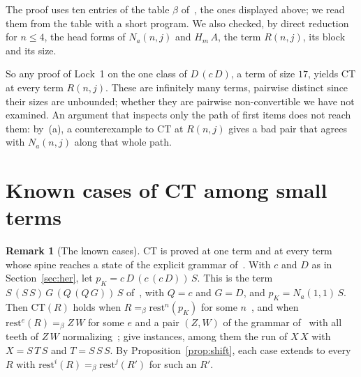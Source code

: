 \documentclass[11pt]{amsart}
\theoremstyle{definition}
\newtheorem{remark}[theorem]{Remark}
\newcommand{\conv}{=_\beta}
\newcommand{\rest}{\mathrm{rest}}
\newcommand{\CT}{\mathrm{CT}}
\begin{document}
The proof uses ten entries of the table $\beta$ of~\citep{s1}, the ones displayed above; we read
them from the table with a short program. We also checked, by direct reduction for $n\le4$, the head
forms of $N_a(n,j)$ and $H_m\,A$, the term $R(n,j)$, its block and its size.

So any proof of Lock~1 on the one class of $D\,(c\,D)$, a term of size $17$, yields CT at every
term $R(n,j)$. These are infinitely many terms, pairwise distinct since their sizes are unbounded;
whether they are pairwise non-convertible we have not examined. An argument that inspects only the
path of first items does not reach them: by~(a), a counterexample to CT at $R(n,j)$ gives a bad
pair that agrees with $N_a(n,j)$ along that whole path.

\section{Known cases of CT among small terms}\label{sec:known}

\begin{remark}[The known cases]\label{rem:known}
CT is proved at one term and at every term whose spine reaches a state of the explicit grammar
of~\citep{s12}. With $c$ and $D$ as in Section~\ref{sec:her}, let $p_K=c\,D\,(c\,(c\,D))\,S$. This
is the term $S\,(S\,S)\,G\,(Q\,(Q\,G))\,S$ of~\citep{s11}, with $Q=c$ and $G=D$, and $p_K=N_a(1,1)\,S$.
Then $\CT(R)$ holds when $R\conv\rest^n(p_K)$ for some $n$~\citep[Theorem~1 and
Corollary~2]{s11}, and when $\rest^e(R)\conv Z\,W$ for some $e$ and a pair $(Z,W)$ of the grammar
of~\citep[Definition~1]{s12} with all teeth of $Z\,W$ normalizing~\citep[Theorem~2]{s12};
\citep[Corollaries~3 and~4]{s12} give instances, among them the run of $X\,X$ with $X=S\,T\,S$ and
$T=S\,S\,S$. By Proposition~\ref{prop:shift}, each case extends to every $R$ with
$\rest^i(R)\conv\rest^j(R')$ for such an $R'$.
\end{remark}
\end{document}
